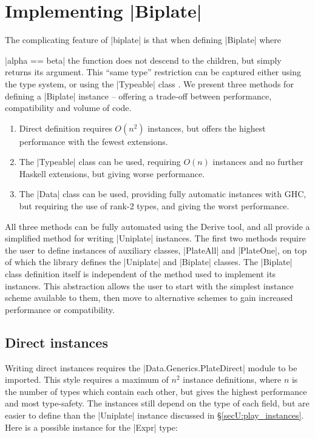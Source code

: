 \section{Implementing |Biplate|}
\label{secU:implement_playex}

The complicating feature of |biplate| is that when defining |Biplate| where \ignore|alpha == beta| the function does not descend to the children, but simply returns its argument. This ``same type'' restriction can be captured either using the type system, or using the |Typeable| class \cite{lammel:syb}. We present three methods for defining a |Biplate| instance -- offering a trade-off between performance, compatibility and volume of code.

\begin{enumerate}
\item Direct definition requires $O(n^2)$ instances, but offers the highest performance with the fewest extensions.
\item The |Typeable| class can be used, requiring $O(n)$ instances and no further Haskell extensions, but giving worse performance.
\item The |Data| class can be used, providing fully automatic instances with GHC, but requiring the use of rank-2 types, and giving the worst performance.
\end{enumerate}

All three methods can be fully automated using the Derive tool, and all provide a simplified method for writing |Uniplate| instances. The first two methods require the user to define instances of auxiliary classes, |PlateAll| and |PlateOne|, on top of which the library defines the |Uniplate| and |Biplate| classes. The |Biplate| class definition itself is independent of the method used to implement its instances. This abstraction allows the user to start with the simplest instance scheme available to them, then move to alternative schemes to gain increased performance or compatibility.


\subsection{Direct instances}
\label{secU:implement_playdirect}

Writing direct instances requires the |Data.Generics.PlateDirect| module to be imported. This style requires a maximum of $n^2$ instance definitions, where $n$ is the number of types which contain each other, but gives the highest performance and most type-safety. The instances still depend on the type of each field, but are easier to define than the |Uniplate| instance discussed in \S\ref{secU:play_instances}. Here is a possible instance for the |Expr| type:

